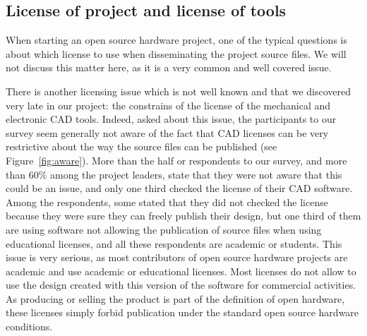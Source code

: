 \documentclass[letterpaper, 10 pt, conference]{ieeeconf}  %
\begin{document}
\subsection{License of project and license of tools}

When starting an open source hardware project, one of the typical questions is about which license to use when disseminating the project source files. 
We will not discuss this matter here, as it is a very common and well covered issue. 

There is another licensing issue which is not well known and that we discovered very late in our project: the constrains of the license of the mechanical and electronic CAD tools. 
Indeed, asked about this issue, the participants to our survey seem generally not aware of the fact that CAD licenses can be very restrictive about the way the source files can be published (see Figure~\ref{fig:aware}).
More than the half or respondents to our survey, and more than 60\% among the project leaders, state that they were not aware that this could be an issue, and only one third checked the license of their CAD software. 
Among the respondents, some stated that they did not checked the license because they were sure they can freely publish their design, but one third of them are using software not allowing the publication of source files when using educational licenses, and all these respondents are academic or students.
This issue is very serious, as most contributors of open source hardware projects are academic and use academic or educational licenses. 
Most licenses do not allow to use the design created with this version of the software for commercial activities. 
As producing or selling the product is part of the definition of open hardware, these licenses simply forbid publication under the standard open source hardware conditions. 
\end{document}
